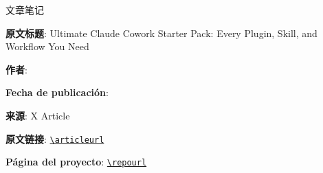 
\begin{titlepage}
\centering
{\Large 文章笔记\par}
\vspace{1.2cm}
{\huge\bfseries \notetitle\par}
\vspace{0.8cm}
{\large \noteauthors\par}
\vspace{0.3cm}
{\large \notedate\par}
\vspace{2cm}

\vfill
\begin{tcolorbox}[width=0.9\textwidth, colback=black!2!white, colframe=black!60, sharp corners]
\textbf{原文标题}: Ultimate Claude Cowork Starter Pack: Every Plugin, Skill, and Workflow You Need\par
\textbf{作者}: \articleauthor\par
\textbf{Fecha de publicación}: \articlepublishdate\par
\textbf{来源}: X Article\par
\textbf{原文链接}: \href{\articleurl}{\nolinkurl{\articleurl}}\par
\textbf{Página del proyecto}: \href{\repourl}{\nolinkurl{\repourl}}\par
\end{tcolorbox}
\end{titlepage}

\tableofcontents
\newpage


